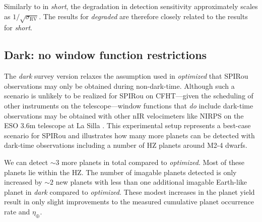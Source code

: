 Similarly to in \emph{short}, the degradation in detection sensitivity approximately scales as
$1/\sqrt{\sigma_{\text{RV}}}$. The results for \emph{degraded} are therefore closely related to the results for
\emph{short}.

\subsection{Dark: no window function restrictions}
The \emph{dark} survey version relaxes the assumption used in \emph{optimized} that SPIRou observations may
only be obtained during non-dark-time. Although such a scenario is unlikely to be realized for SPIRou on
CFHT---given the scheduling of other instruments on the telescope---window functions that \emph{do} include
dark-time observations may be obtained with other nIR velocimeters like
NIRPS on the ESO 3.6m telescope at La Silla \citep{bouchy17}. This experimental setup represents a best-case
scenario for SPIRou and illustrates how many more planets can be detected with dark-time observations
including a number of HZ planets around M2-4 dwarfs.

We can detect $\sim 3$ more planets in total compared to \emph{optimized}. Most of these planets lie within
the HZ. The number of imagable planets detected is only increased by $\sim 2$ new planets with less than one
additional imagable Earth-like planet in \emph{dark} compared to \emph{optimized}. These modest increases in
the planet yield result in only slight improvements to the measured cumulative planet occurrence rate and
$\eta_{\oplus}$.




\appendix
